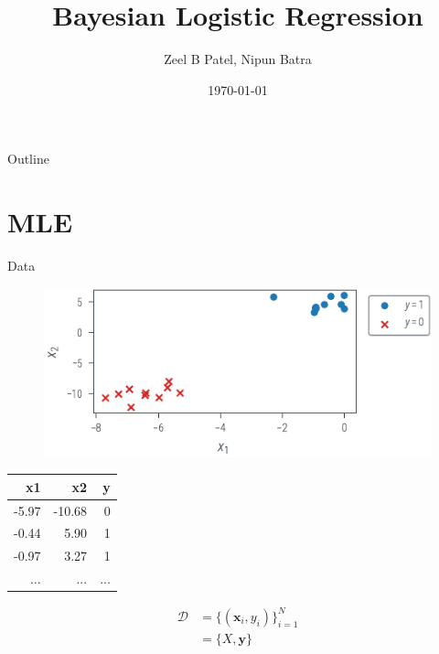 \documentclass{beamer}
\newcommand{\data}{\mathcal{D}}
\begin{document}
\title{Bayesian Logistic Regression}
\author{Zeel B Patel, Nipun Batra}
\date{\today}
\maketitle


\begin{frame}{Outline}
    \tableofcontents
\end{frame}

\section{MLE}

\begin{frame}{Data}
    \begin{figure}
        \includegraphics[]{../figures/bayesian-logistic-regression/data.pdf}
    \end{figure}
    \pause
    \begin{minipage}[t]{0.5\textwidth}
        \begin{table}
            \begin{tabular}{rrr}
                \toprule
                x1    & x2     & y   \\
                \midrule
                -5.97 & -10.68 & 0   \\
                -0.44 & 5.90   & 1   \\
                -0.97 & 3.27   & 1   \\
                ...   & ...    & ... \\
                \bottomrule
            \end{tabular}
        \end{table}
    \end{minipage}
    \hfill
    \pause
    \begin{minipage}[t]{0.4\textwidth}
        \begin{align*}
            \data & = \{(\boldsymbol{x}_i, y_i)\}_{i=1}^N \\
                  & = \{X, \boldsymbol{y}\}
        \end{align*}
    \end{minipage}

\end{frame}
\end{document}
